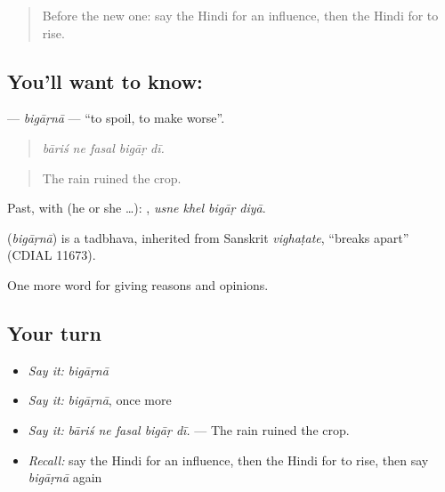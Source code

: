 \label{lesson:HI-C344-bigaarna}



\begin{quote}
Before the new one: say the Hindi for an influence, then the Hindi for to rise.
\end{quote}

\subsection*{You'll want to know: }
\textbf{} — \emph{bigāṛnā} — \textquotedblleft{}to spoil, to make worse\textquotedblright{}.

\begin{quote}
    
\end{quote}

\begin{quote}
\emph{bāriś ne fasal bigāṛ dī.}
\end{quote}

\begin{quote}
The rain ruined the crop.
\end{quote}

Past, with  (he or she …):    , \emph{usne khel bigāṛ diyā}.

\begin{cousinweb}
\textbf{} (\emph{bigāṛnā}) is a tadbhava, inherited from Sanskrit \emph{vighaṭate}, \textquotedblleft{}breaks apart\textquotedblright{} (CDIAL 11673).
\end{cousinweb}

\begin{grammarlens}[title={What you've built}]
One more word for giving reasons and opinions.
\end{grammarlens}

\subsection*{Your turn}
\begin{itemize}
\raggedright
  \item \emph{Say it:} \emph{bigāṛnā}
  \item \emph{Say it:} \emph{bigāṛnā}, once more
  \item \emph{Say it:} \emph{bāriś ne fasal bigāṛ dī.} — The rain ruined the crop.
  \item \emph{Recall:} say the Hindi for an influence, then the Hindi for to rise, then say \emph{bigāṛnā} again
\end{itemize}

